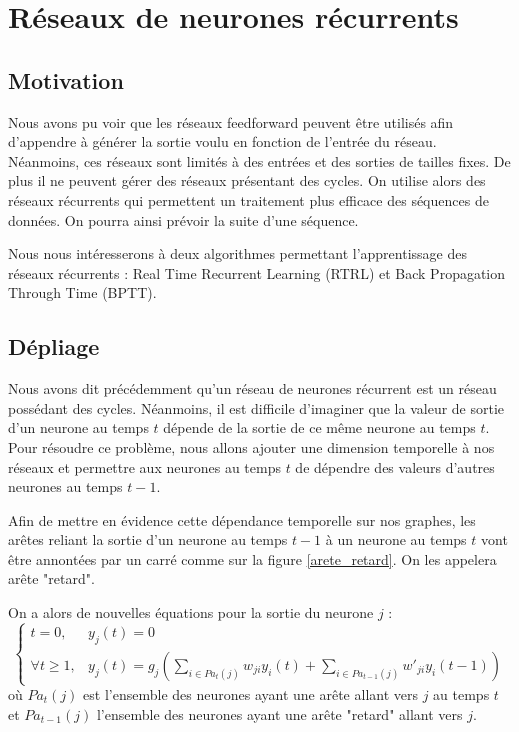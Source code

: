 \documentclass{report}
\theoremstyle{plain}
\theoremstyle{definition}
\theoremstyle{remark}
\begin{document}
\chapter{Réseaux de neurones récurrents}
\section{Motivation}
Nous avons pu voir que les réseaux feedforward peuvent être utilisés afin d'appendre à générer la sortie voulu en fonction de l'entrée du réseau. 
Néanmoins, ces réseaux sont limités à des entrées et des sorties de tailles fixes. De plus il ne peuvent gérer des réseaux présentant des cycles. On utilise alors des réseaux récurrents qui permettent un traitement plus efficace des séquences de données. On pourra ainsi prévoir la suite d'une séquence.

Nous nous intéresserons à deux algorithmes permettant l'apprentissage des réseaux récurrents : Real Time Recurrent Learning (RTRL) et Back Propagation Through Time (BPTT).

\section{Dépliage}

Nous avons dit précédemment qu'un réseau de neurones récurrent est un réseau possédant des cycles. Néanmoins, il est difficile d'imaginer que la valeur de sortie d'un neurone au temps $t$ dépende de la sortie de ce même neurone au temps $t$. Pour résoudre ce problème, nous allons ajouter une dimension temporelle à nos réseaux et permettre aux neurones au temps $t$ de dépendre des valeurs d'autres neurones au temps $t-1$.

Afin de mettre en évidence cette dépendance temporelle sur nos graphes, les arêtes reliant la sortie d'un neurone au temps $t-1$ à un neurone au temps $t$ vont être annontées par un carré comme sur la figure \ref{arete_retard}. On les appelera arête "retard".


On a alors de nouvelles équations pour la sortie du neurone $j$ :
\begin{equation}
\left\{
\begin{array}{ll}
t = 0, & y_j(t) = 0 \\
\forall t \geq 1, & y_{j}(t) = g_{j}(\sum_{i \in Pa_t(j)}{w_{ji}y_{i}(t)} + \sum_{i \in Pa_{t-1}(j)}{w'_{ji}y_{i}(t-1)})
\end{array}
\right.
\end{equation}
où $Pa_t(j)$ est l'ensemble des neurones ayant une arête allant vers $j$ au temps $t$ et $Pa_{t-1}(j)$ l'ensemble des neurones ayant une arête "retard" allant vers $j$.
\end{document}
